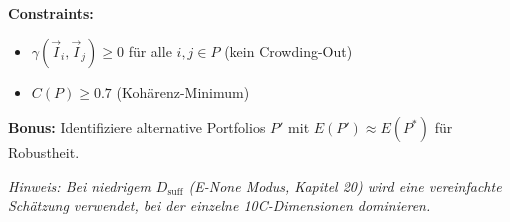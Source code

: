 \begin{tcolorbox}[colback=red!5!white, colframe=red!75!black,
    title=\textbf{Central Question (Grundfrage)}]
\textbf{Constraints:}
\begin{itemize}[nosep]
    \item $\gamma(\vec{I}_i, \vec{I}_j) \geq 0$ für alle $i,j \in P$ (kein Crowding-Out)
    \item $C(P) \geq 0.7$ (Kohärenz-Minimum)
\end{itemize}

\textbf{Bonus:} Identifiziere alternative Portfolios $P'$ mit $E(P') \approx E(P^*)$ für Robustheit.

\vspace{0.5em}
\textit{\small Hinweis: Bei niedrigem $D_{\text{suff}}$ (E-None Modus, Kapitel 20) wird eine vereinfachte Schätzung verwendet, bei der einzelne 10C-Dimensionen dominieren.}

\end{tcolorbox}


